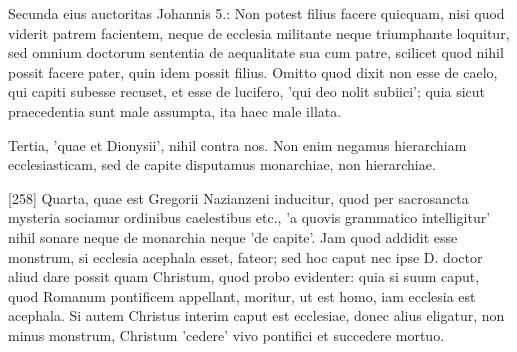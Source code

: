 Secunda eius auctoritas Johannis 5.: Non potest filius facere quicquam, nisi quod viderit patrem facientem, neque de ecclesia militante neque triumphante loquitur, sed omnium doctorum sententia de aequalitate sua cum patre, scilicet quod nihil possit facere pater, quin idem possit filius. Omitto quod dixit non esse de caelo, qui capiti subesse recuset, et esse de lucifero, 'qui deo nolit subiici'; quia sicut praecedentia sunt male assumpta, ita haec male illata.

Tertia, 'quae et Dionysii', nihil contra nos. Non enim negamus hierarchiam ecclesiasticam, sed de capite disputamus monarchiae, non hierarchiae.

[258] Quarta, quae est Gregorii Nazianzeni inducitur, quod per sacrosancta mysteria sociamur ordinibus caelestibus etc., 'a quovis grammatico intelligitur' nihil sonare neque de monarchia neque 'de capite'. Jam quod addidit esse monstrum, si ecclesia acephala esset, fateor; sed hoc caput nec ipse D. doctor aliud dare possit quam Christum, quod probo evidenter: quia si suum caput, quod Romanum pontificem appellant, moritur, ut est homo, iam ecclesia est acephala. Si autem Christus interim caput est ecclesiae, donec alius eligatur, non minus monstrum, Christum 'cedere' vivo pontifici et succedere mortuo.

